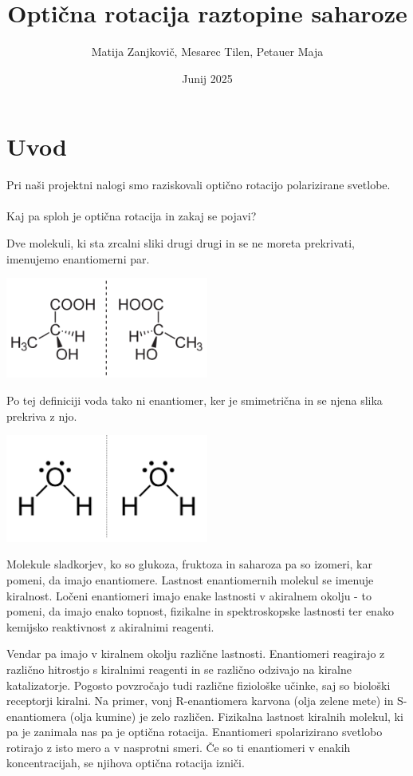 \documentclass[a4paper,12pt]{article}
\title{Optična rotacija raztopine saharoze}
\author{Matija Zanjkovič, Mesarec Tilen, Petauer Maja}
\date{Junij 2025}
\begin{document}
\maketitle

\section*{Uvod}

Pri naši projektni nalogi smo raziskovali optično rotacijo polarizirane svetlobe. \\\\

Kaj pa sploh je optična rotacija in zakaj se pojavi?

Dve molekuli, ki sta zrcalni sliki drugi drugi in se ne moreta prekrivati, imenujemo enantiomerni par.
\begin{center}
    \includegraphics[width=0.5\textwidth]{slike/enantiomer.png}
\end{center}

Po tej definiciji voda tako ni enantiomer, ker je smimetrična in se njena slika prekriva z njo.
\begin{center}
    \includegraphics[width=0.5\textwidth]{slike/voda.png}
\end{center}

Molekule sladkorjev, ko so glukoza, fruktoza in saharoza pa so izomeri, kar pomeni, da imajo enantiomere. Lastnost enantiomernih molekul se imenuje kiralnost.
Ločeni enantiomeri imajo enake lastnosti v akiralnem okolju - to pomeni, da imajo enako topnost, fizikalne in spektroskopske lastnosti ter enako kemijsko reaktivnost z akiralnimi reagenti.

Vendar pa imajo v kiralnem okolju različne lastnosti. Enantiomeri reagirajo z različno hitrostjo s kiralnimi reagenti in se različno odzivajo na kiralne katalizatorje. Pogosto povzročajo tudi različne fiziološke učinke, saj so biološki receptorji kiralni.
Na primer, vonj R-enantiomera karvona (olja zelene mete) in S-enantiomera (olja kumine) je zelo različen. Fizikalna lastnost kiralnih molekul, ki pa je zanimala nas pa je optična rotacija.
Enantiomeri spolarizirano svetlobo rotirajo z isto mero a v nasprotni smeri. Če so ti enantiomeri v enakih koncentracijah, se njihova optična rotacija izniči.
\end{document}
